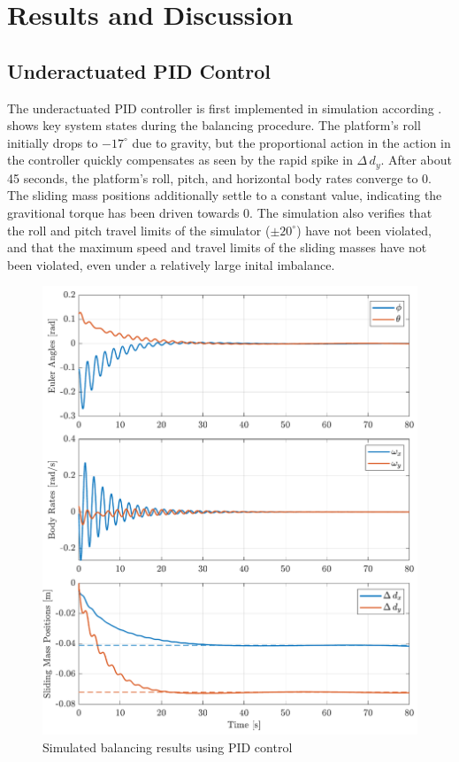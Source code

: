 \chapter{Results and Discussion}\label{chap:results}



\section{Underactuated PID Control}\label{sec:PID_results}

The underactuated PID controller is first implemented in simulation according .  shows key system states during the balancing procedure. The platform's roll initially drops to $-17^{\circ}$ due to gravity, but the proportional action in the action in the controller quickly compensates as seen by the rapid spike in $\Delta\,d_y$. After about 45 seconds, the platform's roll, pitch, and horizontal body rates converge to 0. The sliding mass positions additionally settle to a constant value, indicating the gravitional torque has been driven towards 0. The simulation also verifies that the roll and pitch travel limits of the simulator ($\pm20^{\circ}$) have not been violated, and that the maximum speed and travel limits of the sliding masses have not been violated, even under a relatively large inital imbalance.

\begin{figure}[p!]
    \centering
    \includegraphics[width=\linewidth]{plots/PID_sim_results.pdf}
    \caption{Simulated balancing results using PID control}
    \label{fig:PID_sim_results}
\end{figure}


